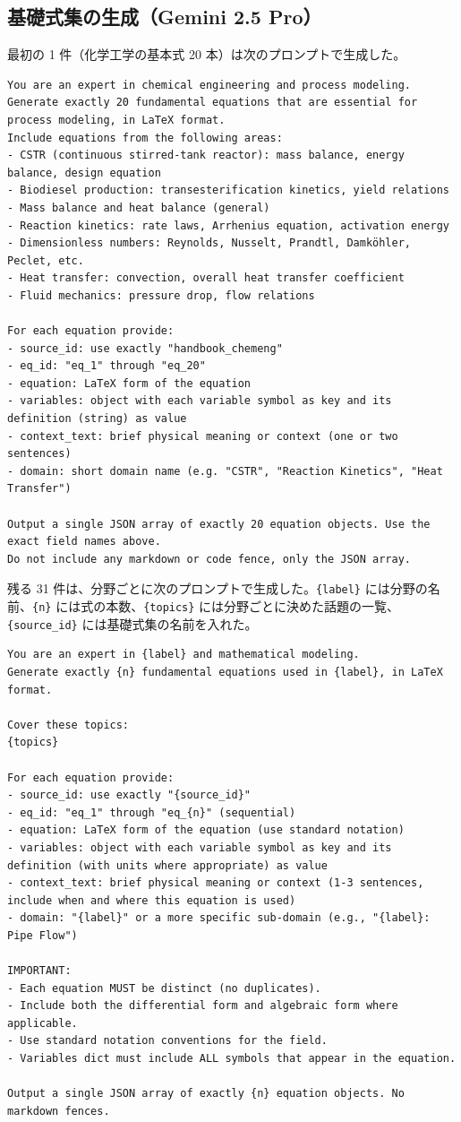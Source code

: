 \documentclass[11pt,a4paper]{ltjsarticle}
\begin{document}
\subsection{基礎式集の生成（Gemini 2.5 Pro）}
最初の 1 件（化学工学の基本式 20 本）は次のプロンプトで生成した。
\begin{Verbatim}[fontsize=\scriptsize, breaklines=true, frame=single]
You are an expert in chemical engineering and process modeling.
Generate exactly 20 fundamental equations that are essential for process modeling, in LaTeX format.
Include equations from the following areas:
- CSTR (continuous stirred-tank reactor): mass balance, energy balance, design equation
- Biodiesel production: transesterification kinetics, yield relations
- Mass balance and heat balance (general)
- Reaction kinetics: rate laws, Arrhenius equation, activation energy
- Dimensionless numbers: Reynolds, Nusselt, Prandtl, Damköhler, Peclet, etc.
- Heat transfer: convection, overall heat transfer coefficient
- Fluid mechanics: pressure drop, flow relations

For each equation provide:
- source_id: use exactly "handbook_chemeng"
- eq_id: "eq_1" through "eq_20"
- equation: LaTeX form of the equation
- variables: object with each variable symbol as key and its definition (string) as value
- context_text: brief physical meaning or context (one or two sentences)
- domain: short domain name (e.g. "CSTR", "Reaction Kinetics", "Heat Transfer")

Output a single JSON array of exactly 20 equation objects. Use the exact field names above.
Do not include any markdown or code fence, only the JSON array.
\end{Verbatim}

残る 31 件は、分野ごとに次のプロンプトで生成した。\texttt{\{label\}} には分野の名前、\texttt{\{n\}} には式の本数、\texttt{\{topics\}} には分野ごとに決めた話題の一覧、\texttt{\{source\_id\}} には基礎式集の名前を入れた。
\begin{Verbatim}[fontsize=\scriptsize, breaklines=true, frame=single]
You are an expert in {label} and mathematical modeling.
Generate exactly {n} fundamental equations used in {label}, in LaTeX format.

Cover these topics:
{topics}

For each equation provide:
- source_id: use exactly "{source_id}"
- eq_id: "eq_1" through "eq_{n}" (sequential)
- equation: LaTeX form of the equation (use standard notation)
- variables: object with each variable symbol as key and its definition (with units where appropriate) as value
- context_text: brief physical meaning or context (1-3 sentences, include when and where this equation is used)
- domain: "{label}" or a more specific sub-domain (e.g., "{label}: Pipe Flow")

IMPORTANT:
- Each equation MUST be distinct (no duplicates).
- Include both the differential form and algebraic form where applicable.
- Use standard notation conventions for the field.
- Variables dict must include ALL symbols that appear in the equation.

Output a single JSON array of exactly {n} equation objects. No markdown fences.
\end{Verbatim}
\end{document}

